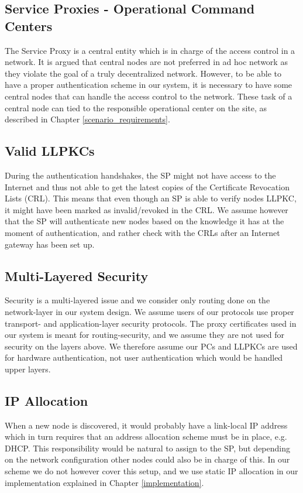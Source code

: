 \subsection{Service Proxies - Operational Command Centers}
The Service Proxy is a central entity which is in charge of the access control in a network. It is argued that central nodes are not preferred in ad hoc network as they violate the goal of a truly decentralized network. However, to be able to have a proper authentication scheme in our system, it is necessary to have some central nodes that can handle the access control to the network. These task of a central node can tied to the responsible operational center on the site, as described in Chapter \ref{scenario_requirements}.

\subsection{Valid LLPKCs}
During the authentication handshakes, the SP might not have access to the Internet and thus not able to get the latest copies of the Certificate Revocation Lists (CRL). This means that even though an SP is able to verify nodes LLPKC, it might have been marked as invalid/revoked in the CRL. We assume however that the SP will authenticate new nodes based on the knowledge it has at the moment of authentication, and rather check with the CRLs after an Internet gateway has been set up. %

\subsection{Multi-Layered Security}
Security is a multi-layered issue and we consider only routing done on the network-layer in our system design. We assume users of our protocols use proper transport- and application-layer security protocols. The proxy certificates used in our system is meant for routing-security, and we assume they are not used for security on the layers above. We therefore assume our PCs and LLPKCs are used for hardware authentication, not user authentication which would be handled upper layers.

\subsection{IP Allocation}
When a new node is discovered, it would probably have a link-local IP address which in turn requires that an address allocation scheme must be in place, e.g. DHCP. This responsibility would be natural to assign to the SP, but depending on the network configuration other nodes could also be in charge of this. In our scheme we do not however cover this setup, and we use static IP allocation in our implementation explained in Chapter \ref{implementation}.

